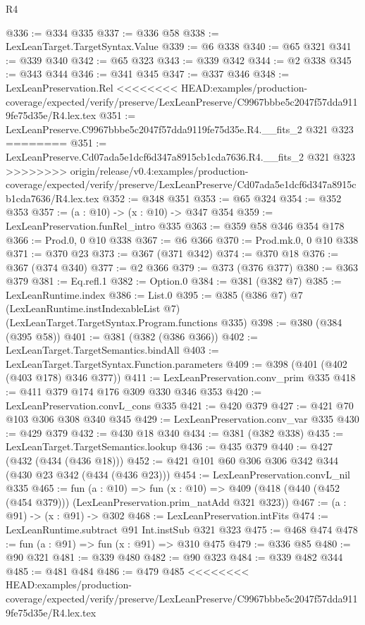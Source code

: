 \begin{lexlean}{R4}
\begin{coremodule}
{{{{{{{{{{{{{{{{{{{{@336 := @334 @335
@337 := @336 @58
@338 := LexLeanTarget.TargetSyntax.Value
@339 := @6 @338
@340 := @65 @321
@341 := @339 @340
@342 := @65 @323
@343 := @339 @342
@344 := @2 @338
@345 := @343 @344
@346 := @341 @345
@347 := @337 @346
@348 := LexLeanPreservation.Rel
<<<<<<<< HEAD:examples/production-coverage/expected/verify/preserve/LexLeanPreserve/C9967bbbe5c2047f57dda9119fe75d35e/R4.lex.tex
@351 := LexLeanPreserve.C9967bbbe5c2047f57dda9119fe75d35e.R4.__fits_2 @321 @323
========
@351 := LexLeanPreserve.Cd07ada5e1dcf6d347a8915cb1cda7636.R4.__fits_2 @321 @323
>>>>>>>> origin/release/v0.4:examples/production-coverage/expected/verify/preserve/LexLeanPreserve/Cd07ada5e1dcf6d347a8915cb1cda7636/R4.lex.tex
@352 := @348 @351
@353 := @65 @324
@354 := @352 @353
@357 := (a : @10) -> (x : @10) -> @347 @354
@359 := LexLeanPreservation.funRel_intro @335
@363 := @359 @58 @346 @354 @178
@366 := Prod.{0, 0} @10 @338
@367 := @6 @366
@370 := Prod.mk.{0, 0} @10 @338
@371 := @370 @23
@373 := @367 (@371 @342)
@374 := @370 @18
@376 := @367 (@374 @340)
@377 := @2 @366
@379 := @373 (@376 @377)
@380 := @363 @379
@381 := Eq.refl.{1}
@382 := Option.{0}
@384 := @381 (@382 @7)
@385 := LexLeanRuntime.index
@386 := List.{0}
@395 := @385
    (@386 @7)
    @7
    (LexLeanRuntime.instIndexableList @7)
    (LexLeanTarget.TargetSyntax.Program.functions @335)
@398 := @380 (@384 (@395 @58))
@401 := @381 (@382 (@386 @366))
@402 := LexLeanTarget.TargetSemantics.bindAll
@403 := LexLeanTarget.TargetSyntax.Function.parameters
@409 := @398 (@401 (@402 (@403 @178) @346 @377))
@411 := LexLeanPreservation.conv_prim @335
@418 := @411 @379 @174 @176 @309 @330 @346 @353
@420 := LexLeanPreservation.convL_cons @335
@421 := @420 @379
@427 := @421 @70 @103 @306 @308 @340 @345
@429 := LexLeanPreservation.conv_var @335
@430 := @429 @379
@432 := @430 @18 @340
@434 := @381 (@382 @338)
@435 := LexLeanTarget.TargetSemantics.lookup
@436 := @435 @379
@440 := @427 (@432 (@434 (@436 @18)))
@452 := @421 @101 @60 @306 @306 @342 @344 (@430 @23 @342 (@434 (@436 @23)))
@454 := LexLeanPreservation.convL_nil @335
@465 := fun (a : @10) =>
  fun (x : @10) => @409 (@418 (@440 (@452 (@454 @379))) (LexLeanPreservation.prim_natAdd @321 @323))
@467 := (a : @91) -> (x : @91) -> @302
@468 := LexLeanPreservation.intFits
@474 := LexLeanRuntime.subtract @91 Int.instSub @321 @323
@475 := @468 @474
@478 := fun (a : @91) => fun (x : @91) => @310 @475
@479 := @336 @85
@480 := @90 @321
@481 := @339 @480
@482 := @90 @323
@484 := @339 @482 @344
@485 := @481 @484
@486 := @479 @485
<<<<<<<< HEAD:examples/production-coverage/expected/verify/preserve/LexLeanPreserve/C9967bbbe5c2047f57dda9119fe75d35e/R4.lex.tex
}}}}}}}}}}}}}}}}}}}}
\end{coremodule}
\end{lexlean}
